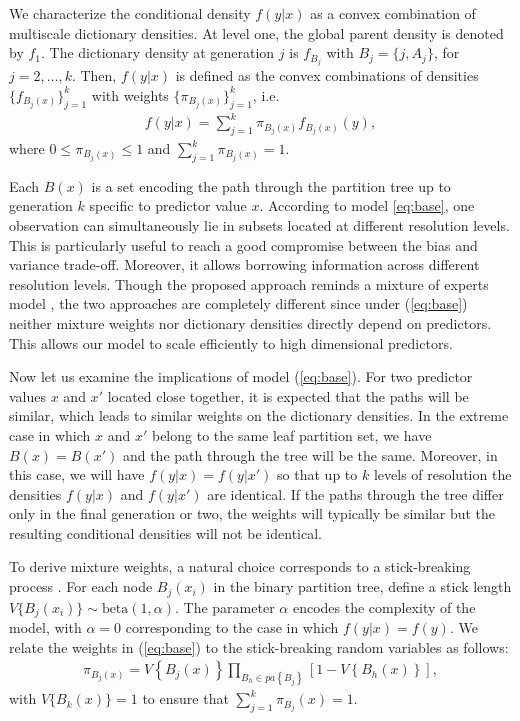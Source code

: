\documentclass{article}
\begin{document}
We characterize the conditional density $f(y|x)$ as a convex combination of multiscale dictionary densities.  At level one, the global parent density is denoted by $f_1$. The dictionary density at generation $j$ is $f_{B_j}$ with $B_j=\{j,A_j\}$, for $j=2,\ldots, k$. Then, $f(y|x)$ is defined as the convex combinations of densities $\{f_{B_j(x)}\}_{j=1}^k$ with weights $\{\pi_{B_j(x)} \}_{j=1}^k$, i.e.
\begin{eqnarray}
f(y|x) = \sum_{j=1}^k \pi_{B_j(x)} f_{B_j(x)}(y),  \label{eq:base}
\end{eqnarray}
where $0 \le \pi_{B_j(x)} \le 1$ and $\sum_{j=1}^k \pi_{B_j(x)}=1$.

Each $B(x)$ is a set encoding the path through the partition tree up to generation $k$ specific to predictor value $x$. According to model \ref{eq:base}, one observation can simultaneously lie in subsets located at different resolution levels. This is particularly useful to reach a good compromise between the bias and variance trade-off.  Moreover, it allows borrowing information across different resolution levels. Though the proposed approach reminds a mixture of experts model \cite{mixtureexperts}, the two approaches are  completely different since under (\ref{eq:base}) neither mixture weights nor dictionary densities directly depend on predictors. This allows our model to scale efficiently to high dimensional predictors.

Now let us examine the implications of model (\ref{eq:base}). For two predictor values $x$ and $x'$ located close together, it is expected that the paths will be similar, which leads to similar weights on the dictionary densities.  In the extreme case in which $x$ and $x'$ belong to the same leaf partition set, we have $B(x) = B(x')$ and the path through the tree will be the same.  Moreover, in this case, we will have $f(y|x)=f(y|x')$ so that up to $k$ levels of resolution the densities $f(y|x)$ and $f(y|x')$ are identical.  If the paths through the tree differ only in the final generation or two, the weights will typically be similar but the resulting conditional densities will not be identical. 

To derive mixture weights, a natural choice corresponds to a stick-breaking process \cite{stickbreaking}.  For each node $B_j(x_i)$ in the binary partition tree, define a stick length $V\{B_j(x_i)\} \sim \mbox{beta}(1,\alpha)$.  The parameter $\alpha$ encodes the complexity of the model, with $\alpha=0$ corresponding to the case in which $f(y|x) = f(y)$.  We relate the weights in (\ref{eq:base}) to the stick-breaking random variables as follows: 
\begin{eqnarray*}
\pi_{B_j(x)} = V\left\{B_j(x)\right\} \prod_{B_h \in pa\left\{B_j\right\}} \left[1 - V\left\{B_h(x)\right\}\right],
\end{eqnarray*}
with $V\{B_k(x)\}=1$ to ensure that $\sum_{j=1}^k \pi_{B_j}(x) = 1$.    
\vskip 12pt
\end{document}
